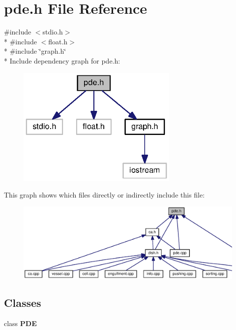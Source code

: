 \section{pde.\-h File Reference}
\label{pde_8h}
{\ttfamily \#include $<$stdio.\-h$>$}\\*
{\ttfamily \#include $<$float.\-h$>$}\\*
{\ttfamily \#include \char`\"{}graph.\-h\char`\"{}}\\*
Include dependency graph for pde.\-h\-:
\nopagebreak
\begin{figure}[H]
\begin{center}
\leavevmode
\includegraphics[width=222pt]{pde_8h__incl}
\end{center}
\end{figure}
This graph shows which files directly or indirectly include this file\-:
\nopagebreak
\begin{figure}[H]
\begin{center}
\leavevmode
\includegraphics[width=350pt]{pde_8h__dep__incl}
\end{center}
\end{figure}
\subsection*{Classes}
\begin{DoxyCompactItemize}
\item 
class {\bf P\-D\-E}
\end{DoxyCompactItemize}
